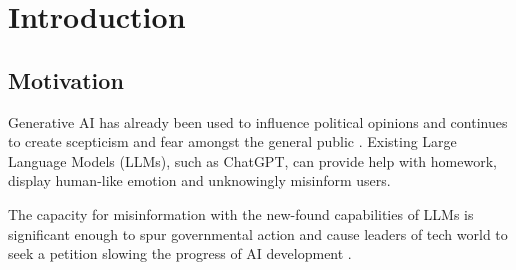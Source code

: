 \documentclass{l4proj}
\theoremstyle{definition}
\begin{document}
%
%
%
%
%
%
%
%
\chapter{Introduction}
    \label{chap:introduction}
    

    \section{Motivation}
        Generative AI has already been used to influence political opinions and continues to create scepticism and fear amongst the general public \citep{leffer2024anxiety}. Existing Large Language Models (LLMs), such as ChatGPT, can provide help with homework, display human-like emotion and unknowingly misinform users.
    
        The capacity for misinformation with the new-found capabilities of LLMs is significant enough to spur governmental action \citep{whitehouse2023ai} and cause leaders of tech world to seek a petition slowing the progress of AI development \citep{life2024pauseai}.
        
\end{document}
